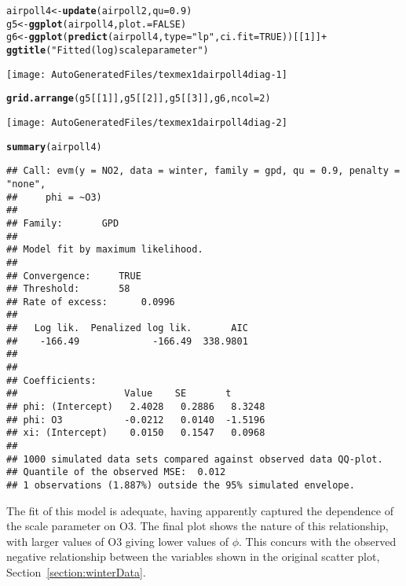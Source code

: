 \documentclass[10pt]{article}\usepackage[]{graphicx}\usepackage[]{color}
\makeatletter
\def\maxwidth{ %
  \ifdim\Gin@nat@width>\linewidth
    \linewidth
  \else
    \Gin@nat@width
  \fi
}
\newcommand{\hlnum}[1]{\textcolor[rgb]{0.686,0.059,0.569}{#1}}%
\newcommand{\hlstr}[1]{\textcolor[rgb]{0.192,0.494,0.8}{#1}}%
\newcommand{\hlopt}[1]{\textcolor[rgb]{0,0,0}{#1}}%
\newcommand{\hlstd}[1]{\textcolor[rgb]{0.345,0.345,0.345}{#1}}%
\newcommand{\hlkwb}[1]{\textcolor[rgb]{0.69,0.353,0.396}{#1}}%
\newcommand{\hlkwc}[1]{\textcolor[rgb]{0.333,0.667,0.333}{#1}}%
\newcommand{\hlkwd}[1]{\textcolor[rgb]{0.737,0.353,0.396}{\textbf{#1}}}%
\newenvironment{kframe}{%
 \def\at@end@of@kframe{}%
 \ifinner\ifhmode%
  \def\at@end@of@kframe{\end{minipage}}%
  \begin{minipage}{\columnwidth}%
 \fi\fi%
 \def\FrameCommand##1{\hskip\@totalleftmargin \hskip-\fboxsep
 \colorbox{shadecolor}{##1}\hskip-\fboxsep
     \hskip-\linewidth \hskip-\@totalleftmargin \hskip\columnwidth}%
 \MakeFramed {\advance\hsize-\width
   \@totalleftmargin\z@ \linewidth\hsize
   \@setminipage}}%
 {\par\unskip\endMakeFramed%
 \at@end@of@kframe}
\newenvironment{knitrout}{}{} %
\makeatother
\begin{document}
\begin{knitrout}
\color{fgcolor}\begin{kframe}
\begin{alltt}
\hlstd{airpoll4} \hlkwb{<-} \hlkwd{update}\hlstd{(airpoll2,}\hlkwc{qu}\hlstd{=}\hlnum{0.9}\hlstd{)}
\hlstd{g5} \hlkwb{<-} \hlkwd{ggplot}\hlstd{(airpoll4,}\hlkwc{plot.}\hlstd{=}\hlnum{FALSE}\hlstd{)}
\hlstd{g6} \hlkwb{<-} \hlkwd{ggplot}\hlstd{(}\hlkwd{predict}\hlstd{(airpoll4,}\hlkwc{type}\hlstd{=}\hlstr{"lp"}\hlstd{,}\hlkwc{ci.fit}\hlstd{=}\hlnum{TRUE}\hlstd{))[[}\hlnum{1}\hlstd{]]} \hlopt{+}
    \hlkwd{ggtitle}\hlstd{(}\hlstr{"Fitted (log)scale parameter"}\hlstd{)}
\end{alltt}
\end{kframe}
\texttt{[image: AutoGeneratedFiles/texmex1dairpoll4diag-1]} 
\begin{kframe}\begin{alltt}
\hlkwd{grid.arrange}\hlstd{(g5[[}\hlnum{1}\hlstd{]],g5[[}\hlnum{2}\hlstd{]],g5[[}\hlnum{3}\hlstd{]],g6,}\hlkwc{ncol}\hlstd{=}\hlnum{2}\hlstd{)}
\end{alltt}
\end{kframe}
\texttt{[image: AutoGeneratedFiles/texmex1dairpoll4diag-2]} 
\begin{kframe}\begin{alltt}
\hlkwd{summary}\hlstd{(airpoll4)}
\end{alltt}
\begin{verbatim}
## Call: evm(y = NO2, data = winter, family = gpd, qu = 0.9, penalty = "none", 
##     phi = ~O3)
## 
## Family:       GPD 
## 
## Model fit by maximum likelihood.
## 
## Convergence:		TRUE
## Threshold:		58
## Rate of excess:		0.0996
## 
##   Log lik.  Penalized log lik.       AIC
##    -166.49             -166.49  338.9801
## 
## 
## Coefficients:
##                   Value    SE       t      
## phi: (Intercept)   2.4028   0.2886   8.3248
## phi: O3           -0.0212   0.0140  -1.5196
## xi: (Intercept)    0.0150   0.1547   0.0968
## 
## 1000 simulated data sets compared against observed data QQ-plot.
## Quantile of the observed MSE:  0.012 
## 1 observations (1.887%) outside the 95% simulated envelope.
\end{verbatim}
\end{kframe}
\end{knitrout}
The fit of this model is adequate, having apparently captured the dependence of the scale parameter on O3.  The final plot shows the nature of this relationship, with larger values of O3 giving lower values of $\phi$.  This concurs with the observed negative relationship between the variables shown in the original scatter plot, Section~\ref{section:winterData}.
\end{document}

